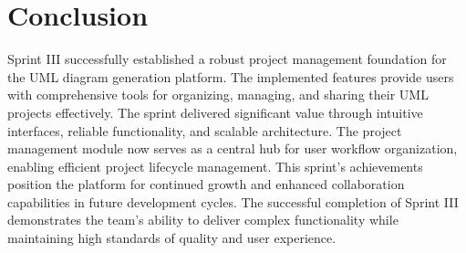 \section{Conclusion}

Sprint III successfully established a robust project management foundation for the UML diagram generation platform. The implemented features provide users with comprehensive tools for organizing, managing, and sharing their UML projects effectively. The sprint delivered significant value through intuitive interfaces, reliable functionality, and scalable architecture. The project management module now serves as a central hub for user workflow organization, enabling efficient project lifecycle management. This sprint's achievements position the platform for continued growth and enhanced collaboration capabilities in future development cycles. The successful completion of Sprint III demonstrates the team's ability to deliver complex functionality while maintaining high standards of quality and user experience.